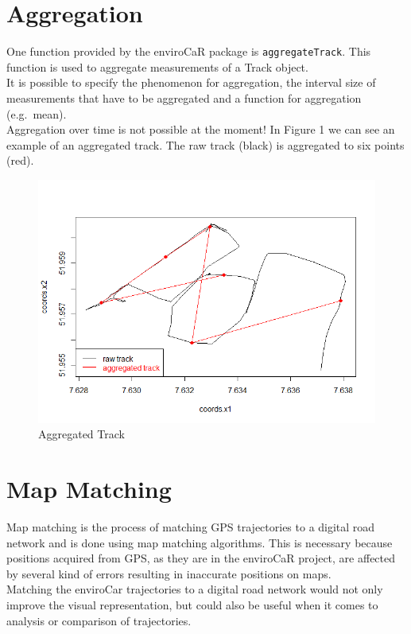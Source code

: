 \documentclass[]{article}
\begin{document}
\newpage

\section{Aggregation}\label{aggregation}

One function provided by the enviroCaR package is
\texttt{aggregateTrack}. This function is used to aggregate measurements
of a Track object.\\It is possible to specify the phenomenon for
aggregation, the interval size of measurements that have to be
aggregated and a function for aggregation (e.g.~mean).\\Aggregation over
time is not possible at the moment! In Figure 1 we can see an example of
an aggregated track. The raw track (black) is aggregated to six points
(red).

\begin{figure}[htbp]
\centering
\includegraphics{figures/agg.png}
\caption{Aggregated Track}
\end{figure}

\section{Map Matching}\label{map-matching}

Map matching is the process of matching GPS trajectories to a digital
road network and is done using map matching algorithms. This is
necessary because positions acquired from GPS, as they are in the
enviroCaR project, are affected by several kind of errors resulting in
inaccurate positions on maps.\\Matching the enviroCar trajectories to a
digital road network would not only improve the visual representation,
but could also be useful when it comes to analysis or comparison of
trajectories.
\end{document}
